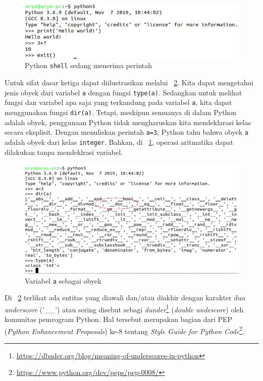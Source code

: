 \begin{figure}[h!]
  \begin{center}
    \includegraphics[scale=.5]{pics/interpreter.png}
    \caption{Python \texttt{shell} sedang menerima perintah}
    \label{fig:interpreter}
  \end{center}
\end{figure}

Untuk sifat dasar ketiga dapat diilustrasikan melalui \figurename~\ref{fig:obyek}. Kita dapat mengetahui jenis obyek dari variabel \texttt{a} dengan fungsi \texttt{type(a)}. Sedangkan untuk melihat fungsi dan variabel apa saja yang terkandung pada variabel \texttt{a}, kita dapat menggunakan fungsi \texttt{dir(a)}. Tetapi, meskipun semuanya di dalam Python adalah obyek, penggunaan Python tidak mengharuskan kita mendeklarasi kelas secara eksplisit. Dengan menuliskan perintah \texttt{a=3}, Python tahu bahwa obyek \texttt{a} adalah obyek dari kelas \texttt{integer}. Bahkan, di \figurename~\ref{fig:interpreter}, operasi aritmatika dapat dilakukan tanpa mendeklrasi variabel.

\begin{figure}[h!]
  \begin{center}
    \includegraphics[scale=.5]{pics/interpreter2a.png}
    \caption{Variabel \texttt{a} sebagai obyek}
    \label{fig:obyek}
  \end{center}
\end{figure}

Di \figurename~\ref{fig:obyek} terlihat ada entitas yang diawali dan/atau diakhir dengan karakter dua \textit{underscore} ('\_\_') atau sering disebut sebagi \textit{dunder}\footnote{\url{https://dbader.org/blog/meaning-of-underscores-in-python}} (\textit{double undescore}) oleh komunitas pemrogram Python. Hal tersebut merupakan bagian dari PEP (\textit{Python Enhancement Proposals}) ke-8 tentang \textit{Style Guide for Python Code}\footnote{\url{https://www.python.org/dev/peps/pep-0008/}}.

